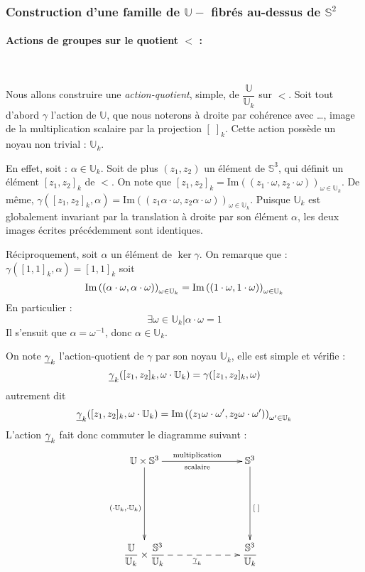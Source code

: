 \subsubsection{Construction d'une famille de $\mathbb{U}-$ fibr\'es au-dessus de $\mathbb{S}^2$}\label{lt1}

\paragraph{Actions de groupes sur le quotient $\lt$ :}~\\
\par
Nous allons construire une \emph{action-quotient}, simple, de $\dfrac{\mathbb{U}}{\mathbb{U}_k}$ sur $\lt$. Soit tout d'abord $\gamma$ l'action de $\mathbb{U}$, %
que nous noterons \`a droite par coh\'erence avec \dots , image de la multiplication scalaire par la projection $[\; ]_k$. Cette action poss\`ede un noyau non trivial : $\mathbb{U}_k$.
\par
En effet, soit : $\alpha\in\mathbb{U}_k$. Soit de plus $(z_1,z_2)$ un \'el\'ement de $\mathbb{S}^3$, qui d\'efinit un \'el\'ement $[z_1,z_2]_k$ de $\lt$. %
On note que $[z_1,z_2]_k=\text{Im}((z_1\cdot\omega ,z_2\cdot\omega ))_{\omega\in\mathbb{U}_k}$. %
De m\^eme, $\gamma ([z_1,z_2]_k,\alpha)=\text{Im}((z_1\alpha\cdot\omega ,z_2\alpha\cdot\omega ))_{\omega\in\mathbb{U}_k}$. %
Puisque $\mathbb{U}_k$ est globalement invariant par la translation \`a droite par son \'el\'ement $\alpha$, les deux images \'ecrites pr\'ec\'edemment sont identiques.
\par
R\'eciproquement, soit $\alpha$ un \'el\'ement de $\ker\gamma$. On remarque que : $\gamma([1,1]_k,\alpha)=[1,1]_k$ soit
\[\pl{\alpha}{\alpha}=\pl{1}{1}\]
En particulier : \[\exists\omega\in\mathbb{U}_k|\alpha\cdot\omega=1\]
Il s'ensuit que $\alpha=\omega^{-1}$, donc $\alpha\in\mathbb{U}_k$.
\par
On note $\gk$ l'action-quotient de $\gamma$ par son noyau $\mathbb{U}_k$, elle est simple et v\'erifie :
\[\gk([z_1,z_2]_k,\omega\cdot\mathbb{U}_k)=\gamma([z_1,z_2]_k,\omega)\]
autrement dit
\[\gk([z_1,z_2]_k,\omega\cdot\mathbb{U}_k)=\pl[\omega ']{z_1\omega}{z_2\omega}\]
L'action $\gk$ fait donc commuter le diagramme suivant :
\[%
\xymatrixrowsep{1in}              %
\xymatrixcolsep{1in}
\xymatrix%
{%
\mathbb{U}\times\mathbb{S}^3\ar[d]_{\left(\cdot\mathbb{U}_k,\cdot\mathbb{U}_k\right)}\ar[r]_{\text{scalaire}}^{\text{multiplication}}&\mathbb{S}^3\ar[d]^{[\; ]}\\%
\dfrac{\mathbb{U}}{\mathbb{U}_k}\times\lt\ar@{-->}[r]_{\gk}&\lt%
}%
\]

